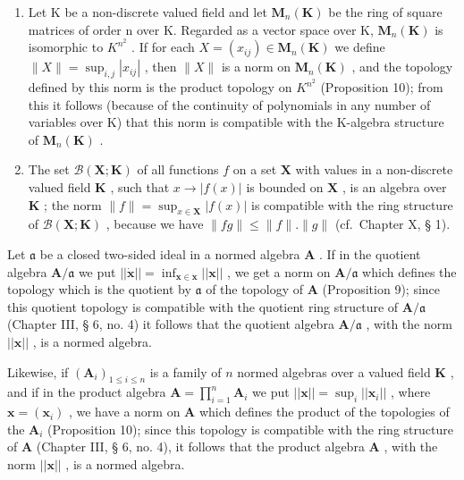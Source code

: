 \begin{enumerate}
\def\labelenumi{\arabic{enumi})}
\setcounter{enumi}{1}
\item
  Let K be a non-discrete valued field and let \(\mathbf{M}_{n}(\mathbf{K})\) be the ring of square matrices of order n over K. Regarded as a vector space over K, \(\mathbf{M}_{n}(\mathbf{K})\) is isomorphic to \(K^{n^{2}}\) . If for each \(X = (x_{ij}) \in \mathbf{M}_{n}(\mathbf{K})\) we define \(\|X\| = \sup_{i,j} |x_{ij}|\) , then \(\|X\|\) is a norm on \(\mathbf{M}_{n}(\mathbf{K})\) , and the topology defined by this norm is the product topology on \(K^{n^{2}}\) (Proposition 10); from this it follows (because of the continuity of polynomials in any number of variables over K) that this norm is compatible with the K-algebra structure of \(\mathbf{M}_{n}(\mathbf{K})\) .
\item
  The set \(\mathcal{B}(\mathbf{X};\mathbf{K})\) of all functions \(f\) on a set \(\mathbf{X}\) with values in a non-discrete valued field \(\mathbf{K}\) , such that \(x\to |f(x)|\) is bounded on \(\mathbf{X}\) , is an algebra over \(\mathbf{K}\) ; the norm \(\| f\| = \sup_{x\in \mathbf{X}}|f(x)|\) is compatible with the ring structure of \(\mathcal{B}(\mathbf{X};\mathbf{K})\) , because we have \(\| fg\| \leqslant \| f\| .\| g\|\) (cf.~Chapter X, § 1).
\end{enumerate}

Let \(\mathfrak{a}\) be a closed two-sided ideal in a normed algebra \(\mathbf{A}\) . If in the quotient algebra \(\mathbf{A} / \mathfrak{a}\) we put \(||\dot{\mathbf{x}}|| = \inf_{\mathbf{x}\in \dot{\mathbf{x}}}||\mathbf{x}||\) , we get a norm on \(\mathbf{A} / \mathfrak{a}\) which defines the topology which is the quotient by \(\mathfrak{a}\) of the topology of \(\mathbf{A}\) (Proposition 9); since this quotient topology is compatible with the quotient ring structure of \(\mathbf{A} / \mathfrak{a}\) (Chapter III, § 6, no. 4) it follows that the quotient algebra \(\mathbf{A} / \mathfrak{a}\) , with the norm \(||\mathbf{x}||\) , is a normed algebra.

Likewise, if \((\mathbf{A}_i)_{1 \leqslant i \leqslant n}\) is a family of \(n\) normed algebras over a valued field \(\mathbf{K}\) , and if in the product algebra \(\mathbf{A} = \prod_{i=1}^{n} \mathbf{A}_i\) we put \(||\boldsymbol{x}|| = \sup_{i} ||\boldsymbol{x}_i||\) , where \(\boldsymbol{x} = (\boldsymbol{x}_i)\) , we have a norm on \(\mathbf{A}\) which defines the product of the topologies of the \(\mathbf{A}_i\) (Proposition 10); since this topology is compatible with the ring structure of \(\mathbf{A}\) (Chapter III, § 6, no. 4), it follows that the product algebra \(\mathbf{A}\) , with the norm \(||\boldsymbol{x}||\) , is a normed algebra.

